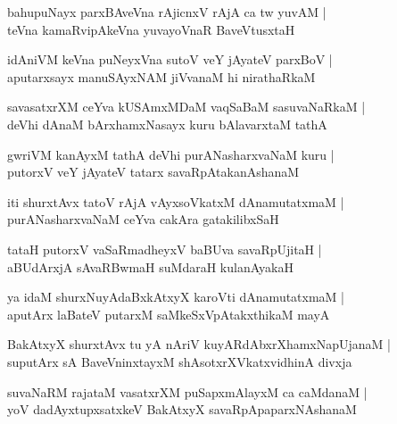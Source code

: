 \begin{shloka}
bahupuNayx parxBAveVna rAjicnxV rAjA ca tw yuvAM |\\
teVna kamaRvipAkeVna yuvayoVnaR BaveVtusxtaH
\end{shloka}

\begin{shloka}
idAniVM keVna puNeyxVna sutoV veY jAyateV parxBoV |\\
aputarxsayx manuSAyxNAM jiVvanaM hi nirathaRkaM
\end{shloka}

\begin{shloka}
savasatxrXM ceYva kUSAmxMDaM vaqSaBaM sasuvaNaRkaM |\\
deVhi dAnaM bArxhamxNasayx kuru bAlavarxtaM tathA
\end{shloka}

\begin{shloka}
gwriVM kanAyxM tathA deVhi purANasharxvaNaM kuru |\\
putorxV veY jAyateV tatarx savaRpAtakanAshanaM
\end{shloka}

\begin{shloka}
iti shurxtAvx tatoV rAjA vAyxsoVkatxM dAnamutatxmaM |\\
purANasharxvaNaM ceYva cakAra gatakilibxSaH
\end{shloka}

\begin{shloka}
tataH putorxV vaSaRmadheyxV baBUva savaRpUjitaH |\\
aBUdArxjA sAvaRBwmaH suMdaraH kulanAyakaH
\end{shloka}

\begin{shloka}
ya idaM shurxNuyAdaBxkAtxyX karoVti dAnamutatxmaM |\\
aputArx laBateV putarxM saMkeSxVpAtakxthikaM mayA
\end{shloka}

\begin{shloka}
BakAtxyX shurxtAvx tu yA nAriV kuyARdAbxrXhamxNapUjanaM |\\
suputArx sA BaveVninxtayxM shAsotxrXVkatxvidhinA divxja
\end{shloka}

\begin{shloka}
suvaNaRM rajataM vasatxrXM puSapxmAlayxM ca caMdanaM |\\
yoV dadAyxtupxsatxkeV BakAtxyX savaRpApaparxNAshanaM
\end{shloka}


